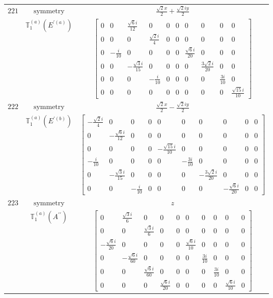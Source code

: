 \documentclass[fleqn,8pt,landscape]{jsarticle}
\begin{document}
\begin{longtable}{ccc}
$ 221 $ & $ \text{symmetry} $ & $ \frac{\sqrt{2} x}{2} + \frac{\sqrt{2} i y}{2} $ \\
$  $ & $ \mathbb{T}_{1}^{(a)}(E^{\prime(a)}) $ & $ \begin{bmatrix} 0 & 0 & \frac{\sqrt{6} i}{12} & 0 & 0 & 0 & 0 & 0 & 0 & 0 \\ 0 & 0 & 0 & \frac{\sqrt{2} i}{4} & 0 & 0 & 0 & 0 & 0 & 0 \\ 0 & - \frac{i}{10} & 0 & 0 & 0 & 0 & \frac{\sqrt{6} i}{20} & 0 & 0 & 0 \\ 0 & 0 & - \frac{\sqrt{3} i}{15} & 0 & 0 & 0 & 0 & \frac{3 \sqrt{2} i}{20} & 0 & 0 \\ 0 & 0 & 0 & - \frac{i}{10} & 0 & 0 & 0 & 0 & \frac{3 i}{10} & 0 \\ 0 & 0 & 0 & 0 & 0 & 0 & 0 & 0 & 0 & \frac{\sqrt{15} i}{10} \end{bmatrix} $ \\ \hline
$ 222 $ & $ \text{symmetry} $ & $ \frac{\sqrt{2} x}{2} - \frac{\sqrt{2} i y}{2} $ \\
$  $ & $ \mathbb{T}_{1}^{(a)}(E^{\prime(b)}) $ & $ \begin{bmatrix} - \frac{\sqrt{2} i}{4} & 0 & 0 & 0 & 0 & 0 & 0 & 0 & 0 & 0 \\ 0 & - \frac{\sqrt{6} i}{12} & 0 & 0 & 0 & 0 & 0 & 0 & 0 & 0 \\ 0 & 0 & 0 & 0 & - \frac{\sqrt{15} i}{10} & 0 & 0 & 0 & 0 & 0 \\ - \frac{i}{10} & 0 & 0 & 0 & 0 & - \frac{3 i}{10} & 0 & 0 & 0 & 0 \\ 0 & - \frac{\sqrt{3} i}{15} & 0 & 0 & 0 & 0 & - \frac{3 \sqrt{2} i}{20} & 0 & 0 & 0 \\ 0 & 0 & - \frac{i}{10} & 0 & 0 & 0 & 0 & - \frac{\sqrt{6} i}{20} & 0 & 0 \end{bmatrix} $ \\ \hline
$ 223 $ & $ \text{symmetry} $ & $ z $ \\
$  $ & $ \mathbb{T}_{1}^{(a)}(A^{\prime\prime}) $ & $ \begin{bmatrix} 0 & \frac{\sqrt{3} i}{6} & 0 & 0 & 0 & 0 & 0 & 0 & 0 & 0 \\ 0 & 0 & \frac{\sqrt{3} i}{6} & 0 & 0 & 0 & 0 & 0 & 0 & 0 \\ - \frac{\sqrt{6} i}{20} & 0 & 0 & 0 & 0 & \frac{\sqrt{6} i}{10} & 0 & 0 & 0 & 0 \\ 0 & - \frac{\sqrt{6} i}{60} & 0 & 0 & 0 & 0 & \frac{3 i}{10} & 0 & 0 & 0 \\ 0 & 0 & \frac{\sqrt{6} i}{60} & 0 & 0 & 0 & 0 & \frac{3 i}{10} & 0 & 0 \\ 0 & 0 & 0 & \frac{\sqrt{6} i}{20} & 0 & 0 & 0 & 0 & \frac{\sqrt{6} i}{10} & 0 \end{bmatrix} $ \\ \hline

\end{longtable}
\end{document}
